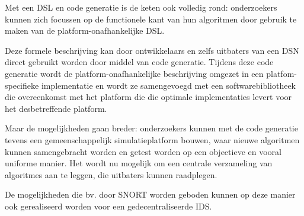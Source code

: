 Met een DSL en code generatie is de keten ook volledig rond: onderzoekers
kunnen zich focussen op de functionele kant van hun algoritmen door gebruik te
maken van de platform-onafhankelijke DSL.

Deze formele beschrijving kan door ontwikkelaars en zelfs uitbaters van een DSN
direct gebruikt worden door middel van code generatie. Tijdens deze code
generatie wordt de platform-onafhankelijke beschrijving omgezet in een
platfom-specifieke implementatie en wordt ze samengevoegd met een
softwarebibliotheek die overeenkomst met het platform die die optimale
implementaties levert voor het desbetreffende platform.

Maar de mogelijkheden gaan breder: onderzoekers kunnen met de code generatie
tevens een gemeenschappelijk simulatieplatform bouwen, waar nieuwe algoritmen
kunnen samengebracht worden en getest worden op een objectieve en vooral
uniforme manier. Het wordt nu mogelijk om een centrale verzameling van
algoritmes aan te leggen, die uitbaters kunnen raadplegen.

De mogelijkheden die bv. door SNORT worden geboden kunnen op deze manier ook
gerealiseerd worden voor een gedecentraliseerde IDS.
